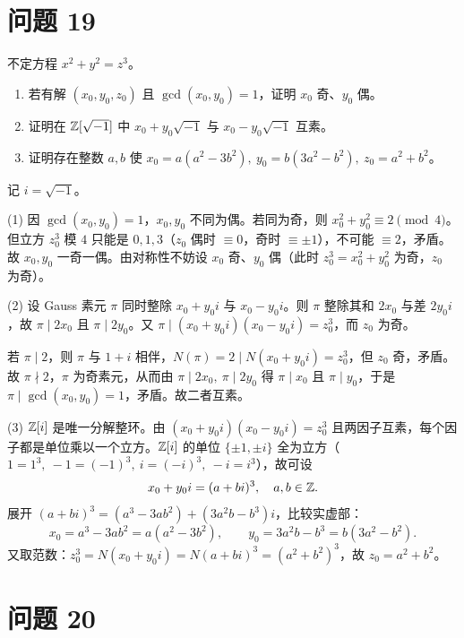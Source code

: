 \documentclass{article}
\begin{document}
\section{问题 19}

不定方程 $x^2+y^2=z^3$。

\begin{enumerate}[(1)]
  \item 若有解 $(x_0,y_0,z_0)$ 且 $\gcd(x_0,y_0)=1$，证明 $x_0$ 奇、$y_0$ 偶。
  \item 证明在 $\mathbb{Z}[\sqrt{-1}]$ 中 $x_0+y_0\sqrt{-1}$ 与 $x_0-y_0\sqrt{-1}$ 互素。
  \item 证明存在整数 $a,b$ 使 $x_0=a(a^2-3b^2),\ y_0=b(3a^2-b^2),\ z_0=a^2+b^2$。
\end{enumerate}

\begin{solution}
  记 $i=\sqrt{-1}$。

  (1) 因 $\gcd(x_0,y_0)=1$，$x_0,y_0$ 不同为偶。若同为奇，则 $x_0^2+y_0^2\equiv2\pmod4$。但立方 $z_0^3$ 模 $4$ 只能是 $0,1,3$（$z_0$ 偶时 $\equiv0$，奇时 $\equiv\pm1$），不可能 $\equiv2$，矛盾。故 $x_0,y_0$ 一奇一偶。由对称性不妨设 $x_0$ 奇、$y_0$ 偶（此时 $z_0^3=x_0^2+y_0^2$ 为奇，$z_0$ 为奇）。

  (2) 设 Gauss 素元 $\pi$ 同时整除 $x_0+y_0i$ 与 $x_0-y_0i$。则 $\pi$ 整除其和 $2x_0$ 与差 $2y_0 i$，故 $\pi\mid 2x_0$ 且 $\pi\mid 2y_0$。又 $\pi\mid(x_0+y_0i)(x_0-y_0i)=z_0^3$，而 $z_0$ 为奇。

  若 $\pi\mid 2$，则 $\pi$ 与 $1+i$ 相伴，$N(\pi)=2\mid N(x_0+y_0i)=z_0^3$，但 $z_0$ 奇，矛盾。故 $\pi\nmid2$，$\pi$ 为奇素元，从而由 $\pi\mid2x_0,\ \pi\mid2y_0$ 得 $\pi\mid x_0$ 且 $\pi\mid y_0$，于是 $\pi\mid\gcd(x_0,y_0)=1$，矛盾。故二者互素。

  (3) $\mathbb{Z}[i]$ 是唯一分解整环。由 $(x_0+y_0i)(x_0-y_0i)=z_0^3$ 且两因子互素，每个因子都是单位乘以一个立方。$\mathbb{Z}[i]$ 的单位 $\{\pm1,\pm i\}$ 全为立方（$1=1^3,\ -1=(-1)^3,\ i=(-i)^3,\ -i=i^3$），故可设
  \[
    x_0+y_0i=(a+bi)^3,\quad a,b\in\mathbb{Z} .
  \]
  展开 $(a+bi)^3=(a^3-3ab^2)+(3a^2b-b^3)i$，比较实虚部：
  \[
    x_0=a^3-3ab^2=a(a^2-3b^2),\qquad y_0=3a^2b-b^3=b(3a^2-b^2).
  \]
  又取范数：$z_0^3=N(x_0+y_0i)=N(a+bi)^3=(a^2+b^2)^3$，故 $z_0=a^2+b^2$。
\end{solution}

\section{问题 20}
\end{document}
